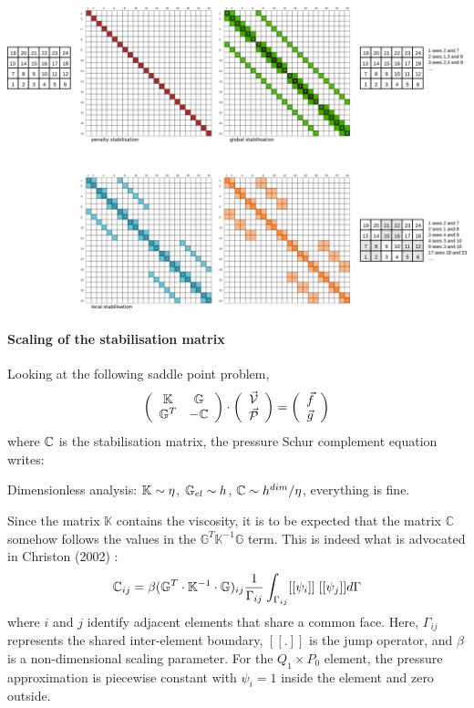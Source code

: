 \begin{center}
\includegraphics[width=15cm]{images/q1p0stab/stabs.png}
\end{center}


\paragraph{Scaling of the stabilisation matrix}

Looking at the following saddle point problem,
\[
\left( \begin{array}{cc}
{\mathbb{K}} & {\mathbb{G}}  \\ 
{\mathbb{G}}^T & -{\mathbb{C}}
\end{array} \right) \cdot
\left( \begin{array}{c}  \vec{\cal V} \\ \vec{\cal P}  \end{array} \right) = 
\left( \begin{array}{c}  \vec{f} \\ \vec{g} \end{array} \right) 
\]
where ${\mathbb{C}}$ is the stabilisation matrix,
the pressure Schur complement equation writes:

\fbox{
\parbox{6cm}{
\[
(\G^T \cdot \K^{-1} \cdot \G  + \C ) \cdot  \vec{\cal P} 
= \K^{-1}\cdot \G \cdot \vec{f} - \vec{h}
\]
}}

Dimensionless analysis: ${\mathbb{K}} \sim \eta$, ${\mathbb{G}}_{el} \sim h$, ${\mathbb{C}} \sim h^{dim}/\eta$, everything is fine.

Since the matrix $\mathbb{K}$ contains the viscosity, it is to be expected that 
the matrix $\mathbb{C}$ somehow follows the values in the $\mathbb{G}^T \mathbb{K}^{-1} \mathbb{G}$  term.
This is indeed what is advocated in Christon (2002) \cite{chri02}:
\[
{\mathbb{C}}_{ij} = \beta ({\mathbb{G}}^T\cdot {\mathbb{K}}^{-1} \cdot {\mathbb{G}})_{ij} 
\frac{1}{\Gamma_{ij}} \int_{\Gamma_{ij}} [[\psi_i]]\;[[\psi_j]] d\Gamma
\]
where $i$ and $j$ identify adjacent elements that share a common face.
Here, $\Gamma_{ij}$ represents the shared inter-element boundary, $[[.]]$ is the jump operator,
and $\beta$ is a non-dimensional scaling parameter.
For the $Q_1\times P_0$ element, the pressure approximation is piecewise constant
with $\psi_i=1$ inside the element and zero outside.

